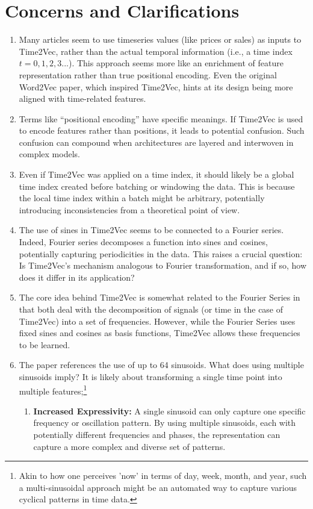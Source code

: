 \documentclass{tufte-handout}
\begin{document}
\section{Concerns and Clarifications}

\begin{enumerate}
\item Many articles seem to use timeseries values (like prices or sales) as inputs to Time2Vec, rather than the actual temporal information (i.e., a time index \( t=0,1,2,3...\)). This approach seems more like an enrichment of feature representation rather than true positional encoding. Even the original Word2Vec paper\cite{word2vec}, which inspired Time2Vec, hints at its design being more aligned with time-related features.

\item Terms like ``positional encoding'' have specific meanings. If Time2Vec is used to encode features rather than positions, it leads to potential confusion. Such confusion can compound when architectures are layered and interwoven in complex models.

\item Even if Time2Vec was applied on a time index, it should likely be a global time index created before batching or windowing the data. This is because the local time index within a batch might be arbitrary, potentially introducing inconsistencies from a theoretical point of view.

\item The use of sines in Time2Vec seems to be connected to a Fourier series. Indeed, Fourier series decomposes a function into sines and cosines, potentially capturing periodicities in the data. This raises a crucial question: Is Time2Vec's mechanism analogous to Fourier transformation, and if so, how does it differ in its application?

\item The core idea behind Time2Vec is somewhat related to the Fourier Series in that both deal with the decomposition of signals (or time in the case of Time2Vec) into a set of frequencies. However, while the Fourier Series uses fixed sines and cosines as basis functions, Time2Vec allows these frequencies to be learned.

\item The paper references the use of up to 64 sinusoids. What does using multiple sinusoids imply? It is likely about transforming a single time point into multiple features;\footnote{Akin to how one perceives 'now' in terms of day, week, month, and year, such a multi-sinusoidal approach might be an automated way to capture various cyclical patterns in time data.}
	\begin{enumerate}
	    \item \textbf{Increased Expressivity:} A single sinusoid can only capture one specific frequency or oscillation pattern. By using multiple sinusoids, each with potentially different frequencies and phases, the representation can capture a more complex and diverse set of patterns.


\end{enumerate}
\end{enumerate}
\end{document}
